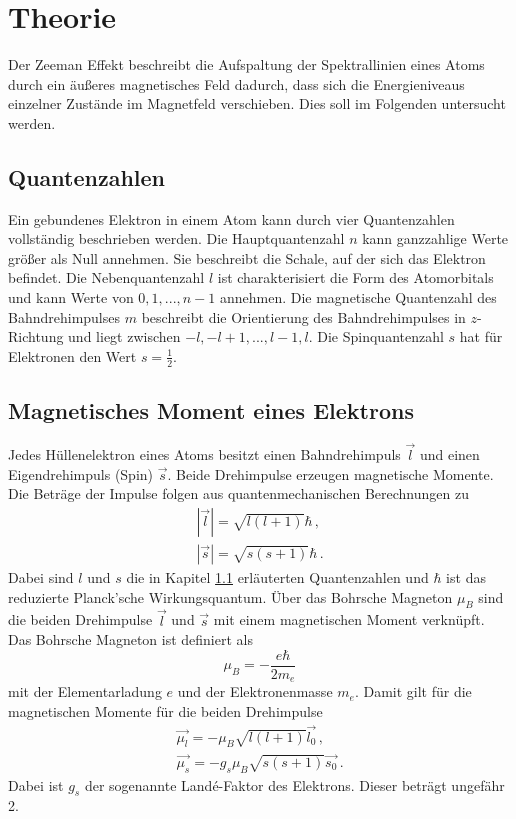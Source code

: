 \section{Theorie}
\label{sec:Theorie}
Der Zeeman Effekt beschreibt die Aufspaltung der Spektrallinien eines Atoms
durch ein äußeres magnetisches Feld dadurch, dass sich die Energieniveaus einzelner
Zustände im Magnetfeld verschieben. Dies soll im Folgenden untersucht werden.

\subsection{Quantenzahlen}
\label{subsec:quanten}

Ein gebundenes Elektron in einem Atom kann durch vier Quantenzahlen vollständig beschrieben werden.
Die Hauptquantenzahl $n$ kann ganzzahlige Werte größer als Null annehmen. Sie beschreibt die Schale, auf der sich das Elektron befindet. Die Nebenquantenzahl
$l$ ist charakterisiert die Form des Atomorbitals und kann Werte von $0,1,...,n-1$ annehmen. Die magnetische Quantenzahl des Bahndrehimpulses
$m$ beschreibt die Orientierung des Bahndrehimpulses in $z$-Richtung und liegt zwischen $-l, -l+1,..., l-1, l$.
Die Spinquantenzahl $s$ hat für
Elektronen den Wert $s=\frac{1}{2}$.

\subsection{Magnetisches Moment eines Elektrons}
Jedes Hüllenelektron eines Atoms besitzt einen Bahndrehimpuls $\vec{l}$ und einen
Eigendrehimpuls (Spin) $\vec{s}$. Beide Drehimpulse erzeugen magnetische Momente.
Die Beträge der Impulse folgen aus quantenmechanischen Berechnungen zu
\begin{align}
  |\vec{l}| = \sqrt{l(l+1)} \hbar  \,, \\
  |\vec{s}| = \sqrt{s(s+1)} \hbar \,.
\end{align}
Dabei sind $l$ und $s$ die in Kapitel \ref{subsec:quanten} erläuterten Quantenzahlen und
$\hbar$ ist das reduzierte Planck'sche Wirkungsquantum.
Über das Bohrsche Magneton $\mu_B$
sind die beiden Drehimpulse $\vec{l}$ und $\vec{s}$ mit einem magnetischen Moment
verknüpft. Das Bohrsche Magneton ist definiert als
\begin{equation}
  \mu_B = -\frac{e \hbar}{2 m_e}
\end{equation}
mit der Elementarladung $e$ und der Elektronenmasse $m_e$.
Damit gilt für die magnetischen Momente für die beiden Drehimpulse
\begin{align}
  \vec{\mu_l} = -\mu_B \sqrt{l(l+1)} \vec{l_0} \,, \\
  \vec{\mu_s} = -g_s \mu_B \sqrt{s(s+1)} \vec{s_0} \,.
\end{align}
Dabei ist $g_s$ der sogenannte Landé-Faktor des Elektrons. Dieser beträgt ungefähr 2.

